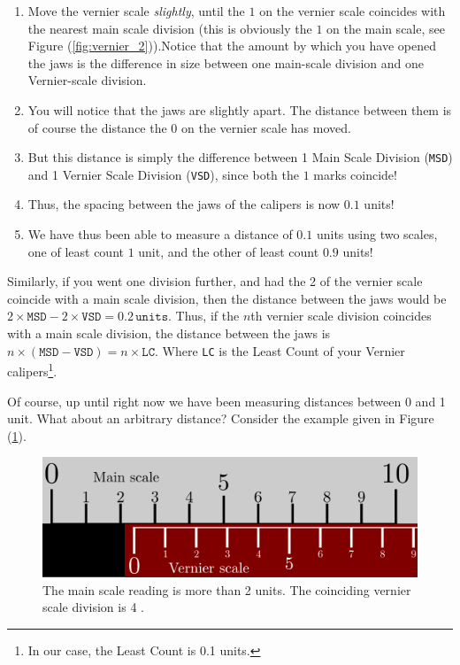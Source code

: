 \begin{enumerate}
    \item Move the vernier scale \textit{slightly}, until the $1$ on the vernier scale coincides with the nearest main scale division (this is obviously the $1$ on the main scale, see Figure (\ref{fig:vernier_2})).Notice that the amount by which you have opened the jaws is the difference in size between one main-scale division and one Vernier-scale division.
    
    \item You will notice that the jaws are slightly apart. The distance between them is of course the distance the $0$ on the vernier scale has moved.
    
    \item But this distance is simply the difference between 1 Main Scale Division (\texttt{MSD}) and 1 Vernier Scale Division (\texttt{VSD}), since both the $1$ marks coincide!
    
    \item Thus, the spacing between the jaws of the calipers is now $0.1$ units!
    
    \item We have thus been able to measure a distance of $0.1$ units using two scales, one of least count $1$ unit, and the other of least count $0.9$ units! 
    
\end{enumerate}

Similarly, if you went one division further, and had the 2 of the vernier scale coincide with a main scale division, then the distance between the jaws would be $2\times\texttt{MSD}-2\times\texttt{VSD}=0.2\, \texttt{units}$. Thus, if the $n$th vernier scale division coincides with a main scale division, the distance between the jaws is $n \times (\texttt{MSD}-\texttt{VSD})=n \times \texttt{LC}$. Where \texttt{LC} is the Least Count of your Vernier calipers\footnote{In our case, the Least Count is 0.1 units.}.

Of course, up until right now we have been measuring distances between 0 and 1 unit.  What about an arbitrary distance? Consider the example given in Figure (\ref{fig:vernier_4}). 

\begin{figure}[!htb]
    \centering
    \includegraphics[scale=0.75]{figs/vernier4.png}
    \caption{The main scale reading is more than 2 units. The coinciding vernier scale division is 4 . }
    \label{fig:vernier_4}
\end{figure}

